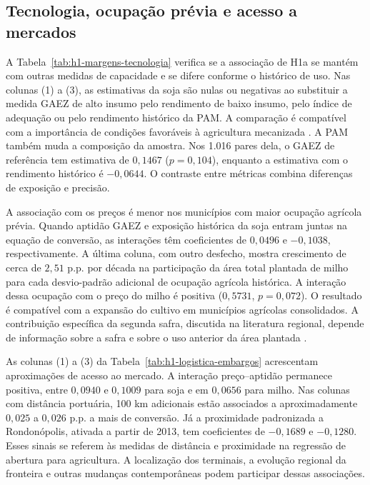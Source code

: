 \subsection{Tecnologia, ocupação prévia e acesso a mercados}
\label{discussao-margens}

A Tabela~\ref{tab:h1-margens-tecnologia} verifica se a associação de H1a se mantém com outras medidas de capacidade e se difere conforme o histórico de uso. Nas colunas (1) a (3), as estimativas da soja são nulas ou negativas ao substituir a medida GAEZ de alto insumo pelo rendimento de baixo insumo, pelo índice de adequação ou pelo rendimento histórico da PAM. A comparação é compatível com a importância de condições favoráveis à agricultura mecanizada \cite{Spera2017}. A PAM também muda a composição da amostra. Nos 1.016 pares dela, o GAEZ de referência tem estimativa de $0{,}1467$ ($p=0{,}104$), enquanto a estimativa com o rendimento histórico é $-0{,}0644$. O contraste entre métricas combina diferenças de exposição e precisão.


\FloatBarrier

A associação com os preços é menor nos municípios com maior ocupação agrícola prévia. Quando aptidão GAEZ e exposição histórica da soja entram juntas na equação de conversão, as interações têm coeficientes de $0{,}0496$ e $-0{,}1038$, respectivamente. A última coluna, com outro desfecho, mostra crescimento de cerca de $2{,}51$ p.p. por década na participação da área total plantada de milho para cada desvio-padrão adicional de ocupação agrícola histórica. A interação dessa ocupação com o preço do milho é positiva ($0{,}5731$, $p=0{,}072$). O resultado é compatível com a expansão do cultivo em municípios agrícolas consolidados. A contribuição específica da segunda safra, discutida na literatura regional, depende de informação sobre a safra e sobre o uso anterior da área plantada \cite{MacedoEtAl2012, VanWeyEtAl2013, Braganca2018}.

As colunas (1) a (3) da Tabela~\ref{tab:h1-logistica-embargos} acrescentam aproximações de acesso ao mercado. A interação preço--aptidão permanece positiva, entre $0{,}0940$ e $0{,}1009$ para soja e em $0{,}0656$ para milho. Nas colunas com distância portuária, 100 km adicionais estão associados a aproximadamente $0{,}025$ a $0{,}026$ p.p. a mais de conversão. Já a proximidade padronizada a Rondonópolis, ativada a partir de 2013, tem coeficientes de $-0{,}1689$ e $-0{,}1280$. Esses sinais se referem às medidas de distância e proximidade na regressão de abertura para agricultura. A localização dos terminais, a evolução regional da fronteira e outras mudanças contemporâneas podem participar dessas associações.

